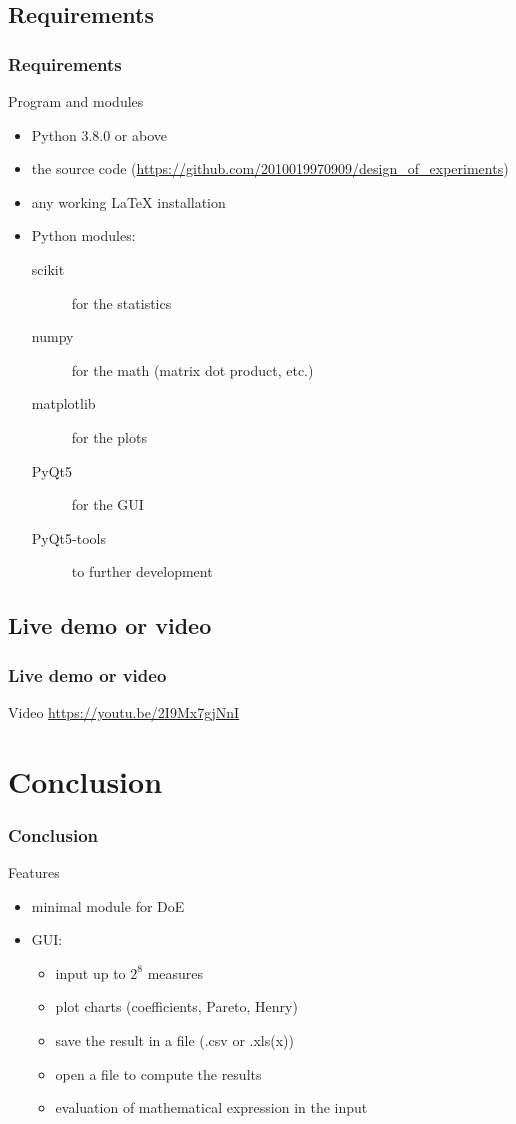 \documentclass[compress, english, aspectratio=169]{beamer}
\begin{document}
\subsection{Requirements}
\begin{frame}
\frametitle{Requirements}
\begin{block}{Program and modules}
\begin{itemize}
\item Python 3.8.0 or above
\item the source code (\url{https://github.com/2010019970909/design_of_experiments})
\item any working LaTeX installation
\item Python modules:\\
\begin{description}
\item[scikit] for the statistics
\item[numpy] for the math (matrix dot product, etc.)
\item[matplotlib] for the plots
\item[PyQt5] for the GUI
\item[PyQt5-tools] to further development
\end{description}
\end{itemize}
\end{block}
\end{frame}

\subsection{Live demo or video}
\begin{frame}
\frametitle{Live demo or video}
\begin{block}{Video}
\url{https://youtu.be/2I9Mx7gjNnI}
\end{block}
\end{frame}

\section{Conclusion}
\begin{frame}
\frametitle{Conclusion}
\begin{block}{Features}
\begin{itemize}
\item minimal module for DoE
\item GUI:
\begin{itemize}
\item input up to $2^8$ measures
\item plot charts (coefficients, Pareto, Henry)
\item save the result in a file (.csv or .xls(x))
\item open a file to compute the results
\item evaluation of mathematical expression in the input
\end{itemize}
\end{itemize}
\end{block}
\end{frame}
\end{document}
